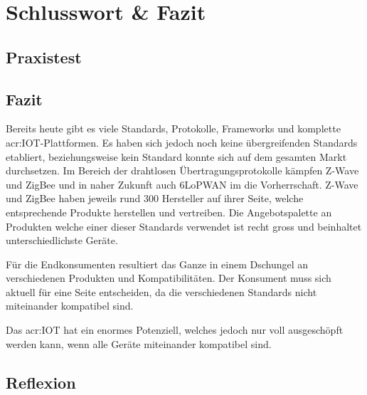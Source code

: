 \chapter{Schlusswort \& Fazit}

\section{Praxistest}

\section{Fazit}
Bereits heute gibt es viele Standards, Protokolle, Frameworks und komplette \gls{acr:IOT}-Plattformen. Es haben sich jedoch noch keine übergreifenden Standards etabliert, beziehungsweise kein Standard konnte sich auf dem gesamten Markt durchsetzen. Im Bereich der drahtlosen Übertragungsprotokolle kämpfen Z-Wave und ZigBee und in naher Zukunft auch 6LoPWAN im die Vorherrschaft. Z-Wave und ZigBee haben jeweils rund 300 Hersteller auf ihrer Seite, welche entsprechende Produkte herstellen und vertreiben. Die Angebotspalette an Produkten welche einer dieser Standards verwendet ist recht gross und beinhaltet unterschiedlichste Geräte.

Für die Endkonsumenten resultiert das Ganze in einem Dschungel an verschiedenen Produkten und Kompatibilitäten. Der Konsument muss sich aktuell für eine Seite entscheiden, da die verschiedenen Standards nicht miteinander kompatibel sind. 

Das \gls{acr:IOT} hat ein enormes Potenziell, welches jedoch nur voll ausgeschöpft werden kann, wenn alle Geräte miteinander kompatibel sind.

\section{Reflexion}
